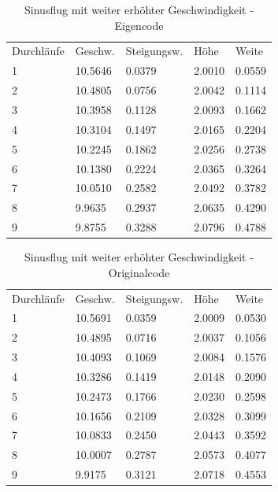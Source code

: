 \documentclass[a4paper,12pt]{scrartcl}
\begin{document}
\begin{table}
\centering
\caption{Sinusflug mit weiter erhöhter Geschwindigkeit -  Eigencode}
\begin{tabular}{lllll}
Durchläufe & Geschw. & Steigungsw. & Höhe   & Weite   \\
1          & 10.5646 & 0.0379      & 2.0010 & 0.0559  \\
2          & 10.4805 & 0.0756      & 2.0042 & 0.1114  \\
3          & 10.3958 & 0.1128      & 2.0093 & 0.1662  \\
4          & 10.3104 & 0.1497      & 2.0165 & 0.2204  \\
5          & 10.2245 & 0.1862      & 2.0256 & 0.2738  \\
6          & 10.1380 & 0.2224      & 2.0365 & 0.3264  \\
7          & 10.0510 & 0.2582      & 2.0492 & 0.3782  \\
8          & 9.9635  & 0.2937      & 2.0635 & 0.4290  \\
9          & 9.8755  & 0.3288      & 2.0796 & 0.4788 
\end{tabular}
\end{table}
\begin{table}
\centering
\caption{Sinusflug mit weiter erhöhter Geschwindigkeit - Originalcode}
\begin{tabular}{lllll}
Durchläufe & Geschw.  & Steigungsw. & Höhe   & Weite      \\
1          & 10.5691 & 0.0359     & 2.0009 &  0.0530  \\
2          & 10.4895 & 0.0716     & 2.0037 &  0.1056  \\
3          & 10.4093 & 0.1069     & 2.0084 &  0.1576  \\
4          & 10.3286 & 0.1419     & 2.0148 &  0.2090  \\
5          & 10.2473 & 0.1766     & 2.0230 &  0.2598  \\
6          & 10.1656 & 0.2109     & 2.0328 &  0.3099  \\
7          & 10.0833 & 0.2450     & 2.0443 &  0.3592  \\
8          & 10.0007 & 0.2787     & 2.0573 &  0.4077  \\
9          & 9.9175 & 0.3121     & 2.0718 &  0.4553 
\end{tabular}
\end{table}
\end{document}
